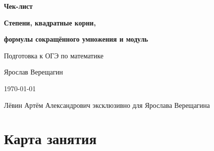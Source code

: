 \documentclass[a4paper,12pt]{article}
\begin{document}

\begin{titlepage}
\thispagestyle{empty}
\centering
\vspace*{2.2cm}

{\Large\bfseries\color{darkaccent} Чек-лист\par}
\vspace{0.7cm}

{\huge\bfseries Степени, квадратные корни,\par}
\vspace{0.15cm}
{\huge\bfseries формулы сокращённого умножения и модуль\par}

\vspace{1.1cm}

{\large Подготовка к ОГЭ по математике\par}
\vspace{0.35cm}
{\large Ярослав Верещагин\par}

\vfill

{\large \today\par}
\vspace{0.65cm}

{\normalsize
Лёвин Артём Александрович эксклюзивно для Ярослава Верещагина\par}

\vfill


\end{titlepage}


\section{Карта занятия}
\end{document}
